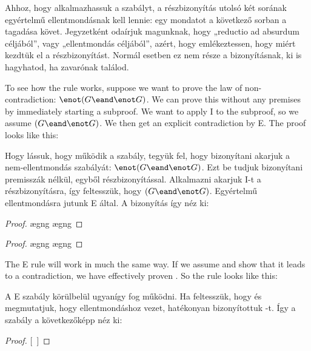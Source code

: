 Ahhoz, hogy alkalmazhassuk a szabályt, a részbizonyítás utolsó két sorának egyértelmű ellentmondásnak kell lennie: egy mondatot a következő sorban a tagadása követ. Jegyzetként odaírjuk magunknak, hogy „reductio ad absurdum céljából”, vagy „ellentmondás céljából”, azért, hogy emlékeztessen, hogy miért kezdtük el a részbizonyítást. Normál esetben ez nem része a bizonyításnak, ki is hagyhatod, ha zavarónak találod.

To see how the rule works, suppose we want to prove the law of non-contradiction: $\enot(G \eand \enot G)$. We can prove this without any premises by immediately starting a subproof. We want to apply {\enot}I to the subproof, so we assume $(G \eand \enot G)$. We then get an explicit contradiction by {\eand}E. The proof looks like this:

Hogy lássuk, hogy működik a szabály, tegyük fel, hogy bizonyítani akarjuk a nem-ellentmondás szabályát: $\enot(G \eand \enot G)$. Ezt be tudjuk bizonyítani premisszák nélkül, egyből részbizonyítással. Alkalmazni akarjuk {\enot}I-t a részbizonyításra, így feltesszük, hogy $(G \eand \enot G)$. Egyértelmű ellentmondásra jutunk {\eand}E által. A bizonyítás így néz ki:

\begin{proof}
	\open
		\ae{gng}
		\ae{gng}
	\close
\end{proof}

\begin{proof}
	\open
		\ae{gng}
		\ae{gng}
	\close
\end{proof}

The {\enot}E rule will work in much the same way. If we assume \enot{} and show that it leads to a contradiction, we have effectively proven . So the rule looks like this:

A {\enot}E szabály körülbelül ugyanígy fog működni. Ha feltesszük, hogy \enot{} és megmutatjuk, hogy ellentmondáshoz vezet, hatékonyan bizonyítottuk -t. Így a szabály a következőképp néz ki:

\begin{proof}
\open
\close
{}[\ ]{}
\end{proof}

